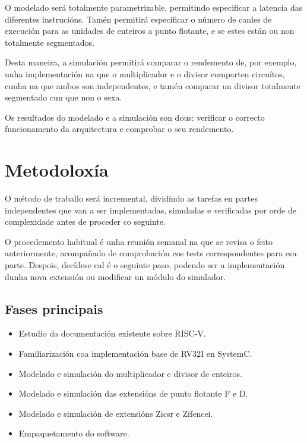 O modelado será totalmente parametrizable, permitindo especificar a latencia das diferentes instrucións. Tamén permitirá especificar o número de canles de execución para as unidades de enteiros a punto flotante, e se estes están ou non totalmente segmentados. 

Desta maneira, a simulación permitirá comparar o rendemento de, por exemplo, unha implementación na que o multiplicador e o divisor comparten circuítos, cunha na que ambos son independentes, e tamén comparar un divisor totalmente segmentado cun que non o sexa. 

Os resultados do modelado e a simulación son dous: verificar o correcto funcionamento da arquitectura e comprobar o seu rendemento. 


\section{Metodoloxía}
\label{sec:metodoloxía}
O método de traballo será incremental, dividindo as tarefas en partes independentes que van a ser implementadas, simuladas e verificadas por orde de complexidade antes de proceder co seguinte.

O procedemento habitual é unha reunión semanal na que se revisa o feito anteriormente, acompañado de comprobación cos tests correspondentes para esa parte. Despois, decídese cal é o seguinte paso, podendo ser a implementación dunha nova extensión ou modificar un módulo do simulador.

\subsection{Fases principais}
\begin{itemize}
    \item Estudio da documentación existente sobre RISC-V.
    \item Familiarización coa implementación base de RV32I en SystemC. 
    \item Modelado e simulación do multiplicador e divisor de enteiros. 
    \item Modelado e simulación das extensións de punto flotante F e D. 
    \item Modelado e simulación de extensións Zicsr e  Zifencei.
    \item Empaquetamento do software. 

\end{itemize}

